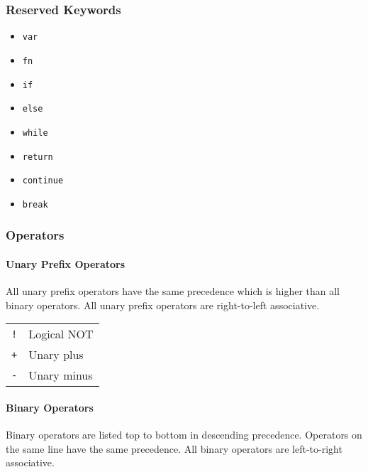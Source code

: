 \documentclass[12pt, a4paper]{article}
\begin{document}
\subsubsection{Reserved Keywords}

\begin{itemize}
    \item \verb|var|
    \item \verb|fn|
    \item \verb|if|
    \item \verb|else|
    \item \verb|while|
    \item \verb|return|
    \item \verb|continue|
    \item \verb|break|
\end{itemize}

\subsubsection{Operators}

\paragraph{Unary Prefix Operators}

All unary prefix operators have the same precedence which is higher than all binary operators. All unary prefix operators are right-to-left associative.

\begin{table}[H]
    \begin{tabular}{ l l }
        \verb|!| & Logical NOT \\
        \verb|+| & Unary plus  \\
        \verb|-| & Unary minus
    \end{tabular}
\end{table}

\paragraph{Binary Operators}

Binary operators are listed top to bottom in descending precedence. Operators on the same line have the same precedence. All binary operators are left-to-right associative.
\end{document}
